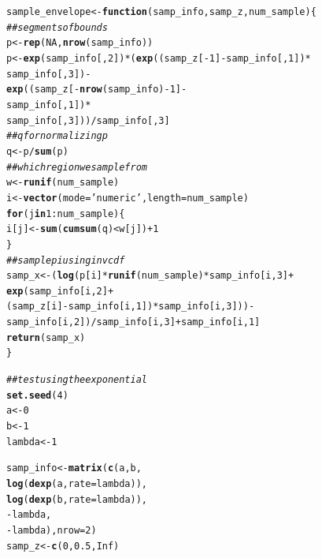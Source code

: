 \documentclass{article}\usepackage[]{graphicx}\usepackage[]{color}
\makeatletter
\newcommand{\hlnum}[1]{\textcolor[rgb]{0.686,0.059,0.569}{#1}}%
\newcommand{\hlstr}[1]{\textcolor[rgb]{0.192,0.494,0.8}{#1}}%
\newcommand{\hlcom}[1]{\textcolor[rgb]{0.678,0.584,0.686}{\textit{#1}}}%
\newcommand{\hlopt}[1]{\textcolor[rgb]{0,0,0}{#1}}%
\newcommand{\hlstd}[1]{\textcolor[rgb]{0.345,0.345,0.345}{#1}}%
\newcommand{\hlkwa}[1]{\textcolor[rgb]{0.161,0.373,0.58}{\textbf{#1}}}%
\newcommand{\hlkwb}[1]{\textcolor[rgb]{0.69,0.353,0.396}{#1}}%
\newcommand{\hlkwc}[1]{\textcolor[rgb]{0.333,0.667,0.333}{#1}}%
\newcommand{\hlkwd}[1]{\textcolor[rgb]{0.737,0.353,0.396}{\textbf{#1}}}%
\newenvironment{kframe}{%
 \def\at@end@of@kframe{}%
 \ifinner\ifhmode%
  \def\at@end@of@kframe{\end{minipage}}%
  \begin{minipage}{\columnwidth}%
 \fi\fi%
 \def\FrameCommand##1{\hskip\@totalleftmargin \hskip-\fboxsep
 \colorbox{shadecolor}{##1}\hskip-\fboxsep
     \hskip-\linewidth \hskip-\@totalleftmargin \hskip\columnwidth}%
 \MakeFramed {\advance\hsize-\width
   \@totalleftmargin\z@ \linewidth\hsize
   \@setminipage}}%
 {\par\unskip\endMakeFramed%
 \at@end@of@kframe}
\newenvironment{knitrout}{}{} %
\makeatother
\begin{document}
\begin{knitrout}
\color{fgcolor}\begin{kframe}
\begin{alltt}
\hlstd{sample_envelope} \hlkwb{<-} \hlkwa{function}\hlstd{(}\hlkwc{samp_info}\hlstd{,} \hlkwc{samp_z}\hlstd{,} \hlkwc{num_sample}\hlstd{)\{}
  \hlcom{## segments of bounds}
  \hlstd{p} \hlkwb{<-} \hlkwd{rep}\hlstd{(}\hlnum{NA}\hlstd{,} \hlkwd{nrow}\hlstd{(samp_info))}
  \hlstd{p} \hlkwb{<-} \hlkwd{exp}\hlstd{(samp_info[,}\hlnum{2}\hlstd{])}\hlopt{*}\hlstd{(}\hlkwd{exp}\hlstd{((samp_z[}\hlopt{-}\hlnum{1}\hlstd{]} \hlopt{-} \hlstd{samp_info[,}\hlnum{1}\hlstd{])}\hlopt{*}
                               \hlstd{samp_info[,}\hlnum{3}\hlstd{])} \hlopt{-}
                           \hlkwd{exp}\hlstd{((samp_z[}\hlopt{-}\hlkwd{nrow}\hlstd{(samp_info)} \hlopt{-} \hlnum{1}\hlstd{]} \hlopt{-}
                                \hlstd{samp_info[,}\hlnum{1}\hlstd{])}\hlopt{*}
                               \hlstd{samp_info[,}\hlnum{3}\hlstd{]))}\hlopt{/}\hlstd{samp_info[,}\hlnum{3}\hlstd{]}
  \hlcom{## q for normalizing p}
  \hlstd{q} \hlkwb{<-} \hlstd{p}\hlopt{/}\hlkwd{sum}\hlstd{(p)}
  \hlcom{## which region we sample from}
  \hlstd{w} \hlkwb{<-} \hlkwd{runif}\hlstd{(num_sample)}
  \hlstd{i} \hlkwb{<-} \hlkwd{vector}\hlstd{(}\hlkwc{mode} \hlstd{=} \hlstr{'numeric'}\hlstd{,} \hlkwc{length} \hlstd{= num_sample)}
  \hlkwa{for} \hlstd{(j} \hlkwa{in} \hlnum{1}\hlopt{:}\hlstd{num_sample)\{}
    \hlstd{i[j]} \hlkwb{<-} \hlkwd{sum}\hlstd{(}\hlkwd{cumsum}\hlstd{(q)} \hlopt{<} \hlstd{w[j])} \hlopt{+} \hlnum{1}
  \hlstd{\}}
  \hlcom{## sample pi using inv cdf}
  \hlstd{samp_x} \hlkwb{<-} \hlstd{(}\hlkwd{log}\hlstd{(p[i]}\hlopt{*}\hlkwd{runif}\hlstd{(num_sample)}\hlopt{*}\hlstd{samp_info[i,} \hlnum{3}\hlstd{]} \hlopt{+}
                   \hlkwd{exp}\hlstd{(samp_info[i,}\hlnum{2}\hlstd{]} \hlopt{+}
                         \hlstd{(samp_z[i]} \hlopt{-} \hlstd{samp_info[i,}\hlnum{1}\hlstd{])}\hlopt{*}\hlstd{samp_info[i,}\hlnum{3}\hlstd{]))} \hlopt{-}
               \hlstd{samp_info[i,}\hlnum{2}\hlstd{])}\hlopt{/}\hlstd{samp_info[i,}\hlnum{3}\hlstd{]} \hlopt{+} \hlstd{samp_info[i,}\hlnum{1}\hlstd{]}
  \hlkwd{return}\hlstd{(samp_x)}
\hlstd{\}}


\hlcom{## test using the exponential}
\hlkwd{set.seed}\hlstd{(}\hlnum{4}\hlstd{)}
\hlstd{a} \hlkwb{<-} \hlnum{0}
\hlstd{b} \hlkwb{<-} \hlnum{1}
\hlstd{lambda} \hlkwb{<-} \hlnum{1}

\hlstd{samp_info} \hlkwb{<-} \hlkwd{matrix}\hlstd{(}\hlkwd{c}\hlstd{(a, b,}
                      \hlkwd{log}\hlstd{(}\hlkwd{dexp}\hlstd{(a,} \hlkwc{rate}\hlstd{=lambda)),}
                      \hlkwd{log}\hlstd{(}\hlkwd{dexp}\hlstd{(b,} \hlkwc{rate}\hlstd{= lambda)),}
                      \hlopt{-}\hlstd{lambda,}
                      \hlopt{-}\hlstd{lambda),} \hlkwc{nrow}\hlstd{=}\hlnum{2}\hlstd{)}
\hlstd{samp_z} \hlkwb{<-} \hlkwd{c}\hlstd{(}\hlnum{0}\hlstd{,} \hlnum{0.5}\hlstd{,} \hlnum{Inf}\hlstd{)}


\end{alltt}
\end{kframe}
\end{knitrout}
\end{document}
